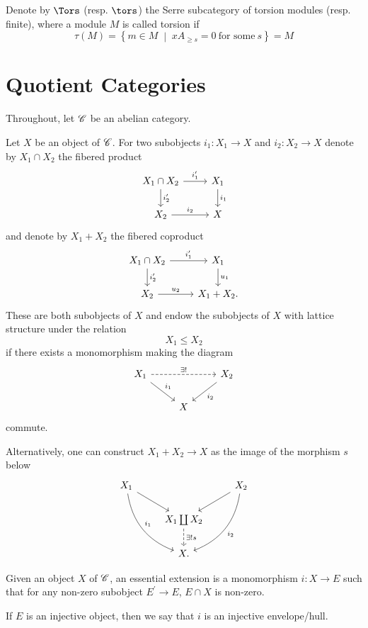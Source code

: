 \documentclass[10pt]{amsart}
\begin{document}
Denote by $\Tors$ (resp. $\tors$) the Serre subcategory of torsion modules (resp. finite), where a module $M$ is called torsion if
$$\tau(M) = \left\{m \in M \;\middle\vert\; xA_{\geq s} = 0\ \text{for some}\ s\right\} = M$$

\section{Quotient Categories}
Throughout, let $\mathscr{C}$ be an abelian category.

\begin{defn}
  Let $X$ be an object of $\mathscr{C}$.
  For two subobjects $i_1 \colon X_1 \rightarrow X$ and $i_2 \colon X_2 \rightarrow X$ denote by $X_1 \cap X_2$ the fibered product
  $$\begin{tikzcd}
    X_1 \cap X_2 \arrow{d}{i_2^\prime}\arrow{r}{i_1^\prime} & X_1\arrow{d}{i_1}\\
    X_2 \arrow{r}{i_2} & X
  \end{tikzcd}$$
  and denote by $X_1 + X_2$ the fibered coproduct 
  $$\begin{tikzcd}
    X_1 \cap X_2 \arrow{r}{i_1^\prime} \arrow{d}{i_2^\prime} & X_1\arrow{d}{u_1}\\
    X_2 \arrow{r}{u_2} & X_1 + X_2.
  \end{tikzcd}$$
  These are both subobjects of $X$ and endow the subobjects of $X$ with lattice structure under the relation
  $$X_1 \leq X_2$$
  if there exists a monomorphism making the diagram
  $$\begin{tikzcd}
    X_1\arrow{rd}{i_1}\arrow[dashed]{rr}{\exists !} & & X_2 \arrow{ld}{i_2}\\
    & X &
  \end{tikzcd}$$
  commute.
\end{defn}

\begin{rmk}
  Alternatively, one can construct $X_1 + X_2 \rightarrow X$ as the image of the morphism $s$ below
  $$\begin{tikzcd}
    X_1\arrow[bend right]{rdd}{i_1}\arrow{rd} & & X_2 \arrow{ld} \arrow[bend left]{ldd}{i_2}\\
    & X_1 \coprod X_2\arrow[dashed]{d}{\exists !s} &\\
    & X. &
  \end{tikzcd}$$
\end{rmk}

\begin{defn}
  Given an object $X$ of $\mathscr{C}$, an essential extension is a monomorphism $i \colon X \rightarrow E$ such that for any non-zero subobject $E^\prime \rightarrow E$, $E \cap X$ is non-zero.
  
  If $E$ is an injective object, then we say that $i$ is an injective envelope/hull.
\end{defn}
\end{document}
